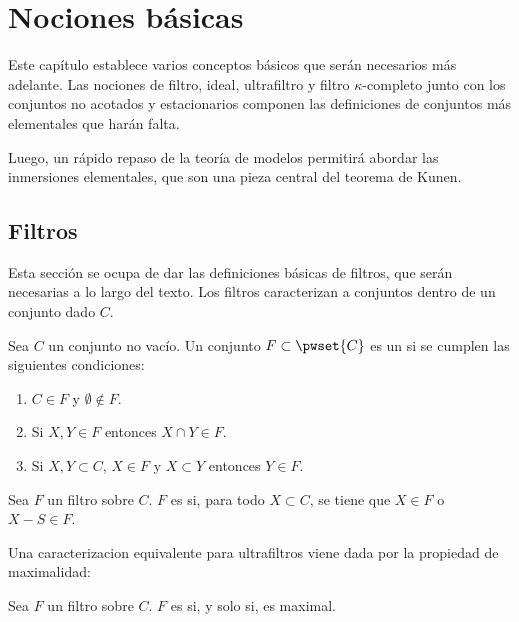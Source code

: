 \chapter{Nociones básicas}

Este capítulo establece varios conceptos básicos que serán necesarios
más adelante. Las nociones de filtro, ideal, ultrafiltro y filtro $\kappa$-completo
junto con los conjuntos no acotados y estacionarios componen las definiciones de
conjuntos más elementales que harán falta.

Luego, un rápido repaso de la teoría de modelos permitirá abordar las inmersiones
elementales, que son una pieza central del teorema de Kunen.

\section{Filtros}

Esta sección se ocupa de dar las definiciones básicas de filtros,
que serán necesarias a lo largo del texto.
Los filtros caracterizan a conjuntos  dentro
de un conjunto dado $C$.

\begin{defi}
    Sea $C$ un conjunto no vacío. Un conjunto $F\subset \pwset{C}$ es un
     si se cumplen las siguientes condiciones:
    \begin{enumerate}[label=\alph*)]
        \item $C\in F$ y $\emptyset\notin F$.
        \item Si $X,Y\in F$ entonces $X\cap Y\in F$.
        \item Si $X,Y\subset C$, $X\in F$ y $X\subset Y$ entonces $Y\in F$.
    \end{enumerate}
\end{defi}

\begin{defi}
    Sea $F$ un filtro sobre $C$. $F$ es  si, para todo $X\subset C$,
    se tiene que $X\in F$ o $X-S\in F$.
\end{defi}

Una caracterizacion equivalente para ultrafiltros viene dada por la propiedad
de maximalidad:

\begin{lem}
    Sea $F$ un filtro sobre $C$. $F$ es  si, y solo si, es maximal.
\end{lem}

